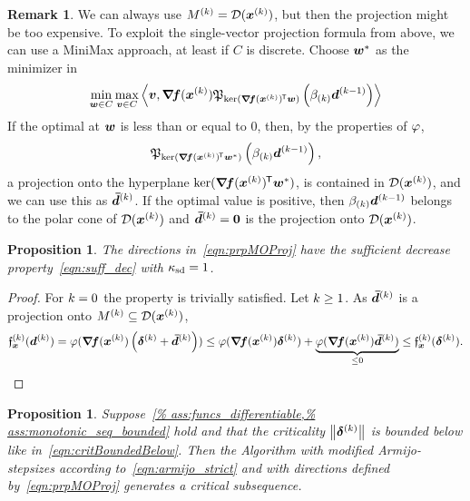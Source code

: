 \documentclass{article}
\theoremstyle{plain}
\newtheorem{proposition}[theorem]{Proposition}
\theoremstyle{definition}
\newtheorem*{remark*}{Remark}
\begin{document}
\begin{remark*}
We can always use $M^{(k)} = \mathcal D(\bm{x}^{(k)})$, but then the projection
might be too expensive.
To exploit the single-vector projection formula from above, 
we can use a MiniMax approach, at least if $C$ is discrete.
Choose $\bm{w}^*$ as the minimizer in
$$
\min_{\bm{w}\in C}
\max_{\bm{v}\in C}
\left\langle 
	\bm{v}, 
	\bm{\nabla}\!\bm{f}(\bm{x}^{(k)})\mathfrak P_{\operatorname*{ker}(\bm{\nabla}\!\bm{f}(\bm{x}^{(k)})^{\mkern-1.5mu\mathsf{T}}\bm{w})}\left(\beta_{(k)} \bm{d}^{(k-1)}\right)
 \right\rangle
$$
If the optimal at $\bm{w}$ is less than or equal to $0$,
then, by the properties of $\varphi$,
$$
\mathfrak P_{\operatorname*{ker}(\bm{\nabla}\!\bm{f}(\bm{x}^{(k)})^{\mkern-1.5mu\mathsf{T}}\bm{w}^*)}\left(\beta_{(k)} \bm{d}^{(k-1)}\right),
$$
a projection onto the hyperplane $\operatorname*{ker}(\bm{\nabla}\!\bm{f}(\bm{x}^{(k)})^{\mkern-1.5mu\mathsf{T}}\bm{w}^*)$,
is contained in $\mathcal D(\bm{x}^{(k)})$, and
we can use this as $\bm{\bar{d}}^{(k)}$.
If the optimal value is positive, then $\beta_{(k)}\bm{d}^{(k-1)}$ belongs to
the polar cone of $\mathcal D(\bm{x}^{(k)})$ and $\bm{\bar{d}}^{(k)} = \bm{0}$
is the projection onto $\mathcal D(\bm{x}^{(k)})$.
\end{remark*}

\begin{proposition}
The directions in~\eqref{eqn:prpMOProj} have the 
sufficient decrease property~\eqref{eqn:suff_dec}
with $\kappa_{\mathrm{sd}} = 1$.
\end{proposition}
\begin{proof}
For $k=0$ the property is trivially satisfied.
Let $k\geq 1$.
As $\bm{\bar{d}}^{(k)}$ is a projection onto $M^{(k)}\subseteq \mathcal D(\bm{x}^{(k)})$,
\begin{align*}
	\mathfrak{f}_{\bm{x}}^{(k)}(\bm{d}^{(k)})
	=
	\varphi(\bm{\nabla}\!\bm{f}(\bm{x}^{(k)})\left(\bm{\delta}^{(k)} + \bm{\bar{d}}^{(k)}\right))
	\leq
	\varphi(\bm{\nabla}\!\bm{f}(\bm{x}^{(k)})\bm{\delta}^{(k)})
	+ 
	\underbrace{\varphi(\bm{\nabla}\!\bm{f}(\bm{x}^{(k)})\bm{\bar{d}}^{(k)})}_{\leq 0}
	\leq 
	\mathfrak{f}_{\bm{x}}^{(k)}(\bm{\delta}^{(k)}).
\end{align*}
\end{proof}

\begin{proposition}
	Suppose~\cref{%
	ass:funcs_differentiable,%
	ass:monotonic_seq_bounded}
	hold and that the criticality $\left\|\bm{\delta}^{(k)}\right\|$ is 
	bounded below like in~\eqref{eqn:critBoundedBelow}.
	Then the Algorithm with modified Armijo-stepsizes
	according to~\eqref{eqn:armijo_strict} and with directions defined
	by~\eqref{eqn:prpMOProj} generates a critical subsequence.
\end{proposition}
\end{document}
